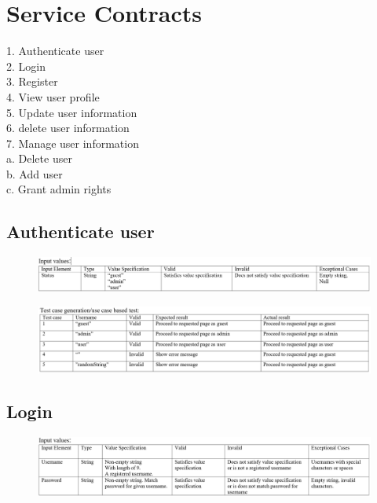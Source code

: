 \documentclass[english]{article}
\begin{document}
\section{Service Contracts}
1.	Authenticate user\\
2.	Login\\
3.	Register\\
4.	View user profile\\
5.	Update user information\\
6.	delete user information\\
7.	Manage user information\\
    a.	Delete user\\
    b.	Add user\\
    c.	Grant admin rights\\

\subsection{Authenticate user}
\begin{figure}[ht!]
\hspace*{-2.5cm} 
\includegraphics[width=180mm]{1.png}
\end{figure}

\begin{figure}[ht!]
\hspace*{-2.5cm} 
\includegraphics[width=180mm]{2.png}
\end{figure}

\subsection{Login}
\begin{figure}[ht!]
\hspace*{-2.5cm} 
\includegraphics[width=180mm]{3.png}
\end{figure}
\end{document}
